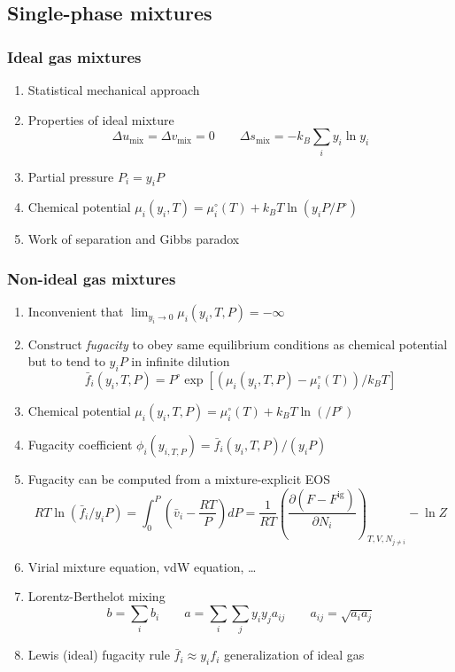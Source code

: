 \documentclass[11pt]{article}
\begin{document}
\subsection{Single-phase mixtures}
\label{sec:org092eb9d}
\subsubsection{Ideal gas mixtures}
\label{sec:orge9de7aa}
\begin{enumerate}
\item Statistical mechanical approach
\item Properties of ideal mixture
\begin{equation*}
  \Delta u_\text{mix} = \Delta v_\text{mix} = 0 \qquad \Delta s_\text{mix} = - k_B \sum_i y_i \ln y_i
\end{equation*}
\item Partial pressure \(P_i = y_i P\)
\item Chemical potential \(\mu_i(y_i,T) = \mu_i^\circ(T) + k_B T \ln \left ( y_i
              P/P^\circ \right)\)
\item Work of separation and Gibbs paradox
\end{enumerate}

\subsubsection{Non-ideal gas mixtures}
\label{sec:org317682c}
\begin{enumerate}
\item Inconvenient that \(\lim_{y_{i}\to 0}\mu_i(y_i,T,P) = -\infty\)
\item Construct \emph{fugacity} to obey same equilibrium conditions as chemical potential but to tend to \(y_{i}P\) in infinite dilution
\begin{equation*}
  \bar{f}_i(y_{i},T,P) = P^{\circ} \exp \left [ (\mu_i(y_i,T,P) - \mu_i^\circ(T))/ k_B T \right ]
\end{equation*}
\item Chemical potential \(\mu_i(y_i,T,P) = \mu_i^\circ(T) + k_B T \ln \left ( /P^\circ \right)\)
\item Fugacity coefficient \(\phi_{i}(y_{i,T,P})=\bar{f}_{i}(y_{i},T,P)/(y_{i}P)\)
\item Fugacity can be computed from a mixture-explicit EOS
\begin{equation*}
	    R T \ln \left ( \bar{f}_i/y_i P \right ) = \int_0^P \left (
      \bar{v}_i - \frac{RT}{P} \right ) dP  =  \frac{1}{RT} \left ( \frac{\partial (F - F^\text{ig})}{\partial N_i} \right )_{T,V,N_{j\neq i}} - \ln Z
 \end{equation*}
\item Virial mixture equation, vdW equation, \ldots
\item Lorentz-Berthelot mixing
\begin{equation*}
  b = \sum_i b_i \qquad a = \sum_i\sum_j y_i y_j a_{ij} \qquad a_{ij} = \sqrt{a_ia_j}
\end{equation*}
\item Lewis (ideal) fugacity rule \(\bar{f}_i \approx y_i f_i\) generalization of ideal gas
\end{enumerate}
\end{document}
